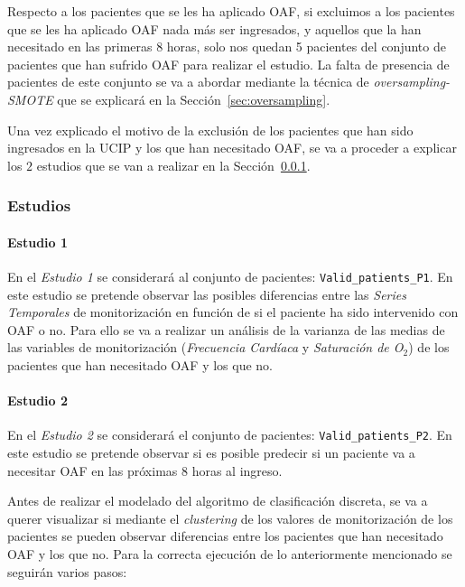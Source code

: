Respecto a los pacientes que se les ha aplicado OAF, si excluimos a los pacientes que se les ha aplicado OAF nada más ser ingresados, y aquellos que la han necesitado en las primeras $8$ horas, solo nos quedan 5 pacientes del conjunto de pacientes que han sufrido OAF para realizar el estudio. La falta de presencia de pacientes de este conjunto se va a abordar mediante la técnica de \textit{oversampling-SMOTE} que se explicará en la Sección~\ref{sec:oversampling}.

Una vez explicado el motivo de la exclusión de los pacientes que han sido ingresados en la UCIP y los que han necesitado OAF, se va a proceder a explicar los $2$ estudios que se van a realizar en la Sección~\ref{sec:estudios}.

\subsubsection{Estudios}\label{sec:estudios}

\paragraph{Estudio 1}\label{sec:estudio1}

En el \textit{Estudio 1} se considerará al conjunto de pacientes: \texttt{Valid\_patients\_P1}. En este estudio se pretende observar las posibles diferencias entre las \textit{Series Temporales} de monitorización en función de si el paciente ha sido intervenido con OAF o no. Para ello se va a realizar un análisis de la varianza de las medias de las variables de monitorización (\textit{Frecuencia Cardíaca} y \textit{Saturación de O$_2$}) de los pacientes que han necesitado OAF y los que no.

\paragraph{Estudio 2}\label{sec:estudio1}

En el \textit{Estudio 2} se considerará el conjunto de pacientes: \texttt{Valid\_patients\_P2}. En este estudio se pretende observar si es posible predecir si un paciente va a necesitar OAF en las próximas $8$ horas al ingreso. 

Antes de realizar el modelado del algoritmo de clasificación discreta, se va a querer visualizar si mediante el \textit{clustering} de los valores de monitorización de los pacientes se pueden observar diferencias entre los pacientes que han necesitado OAF y los que no. Para la correcta ejecución de lo anteriormente mencionado se seguirán varios pasos:

